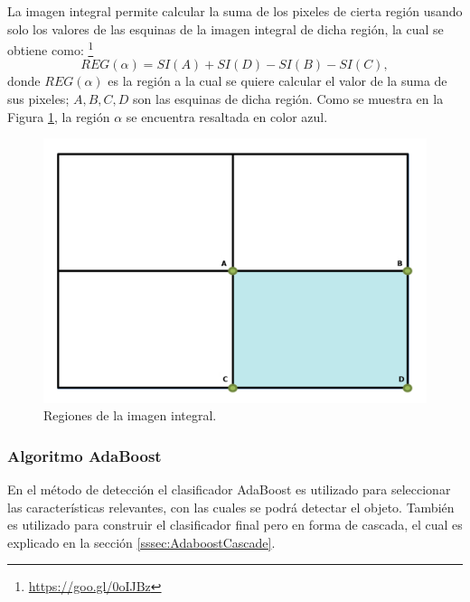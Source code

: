La imagen integral permite calcular la suma de los pixeles de cierta región usando solo los valores de las esquinas de la imagen integral de dicha región, la cual se obtiene como: \footnote{\url{https://goo.gl/0oIJBz}}    
\begin{equation}
REG(\alpha)=SI(A)+SI(D)-SI(B)-SI(C),
\end{equation}
donde $REG(\alpha)$ es la región a la cual se quiere calcular el valor de la suma de sus pixeles; $A,B,C,D$ son las esquinas de dicha región. Como se muestra en la Figura \ref{fig:figImageIntegral}, la región $\alpha$ se encuentra resaltada en color azul.  
\begin{figure}[h!]
\begin{center}
\includegraphics[scale=.25]{./Figures/IntegralImage.png}
\end{center}
\caption{Regiones de la imagen integral.}
\label{fig:figImageIntegral}
\end{figure} 


\subsubsection{Algoritmo AdaBoost}\label{sssec:AdaboostClasifier}  

En el método de detección el clasificador AdaBoost es utilizado para seleccionar las características relevantes, con las cuales se podrá detectar el objeto. También es utilizado para construir el clasificador final pero en forma de cascada, el cual es explicado en la sección \ref{sssec:AdaboostCascade}. 

